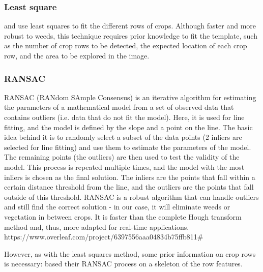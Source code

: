 \subsubsection{Least square}

\citet{LeastSquares2} and \citet{LeastSquares} use least squares to fit the different rows of crops. Although faster and more robust to weeds, this technique requires prior knowledge to fit the template, such as the number of crop rows to be detected, the expected location of each crop row, and the area to be explored in the image. \\


\subsubsection{RANSAC}

RANSAC (RANdom SAmple Consensus) is an iterative algorithm for estimating the parameters of a mathematical model from a set of observed data that contains outliers (i.e. data that do not fit the model). Here, it is used for line fitting, and the model is defined by the slope and a point on the line. The basic idea behind it is to randomly select a subset of the data points (2 inliers are selected for line fitting) and use them to estimate the parameters of the model. The remaining points (the outliers) are then used to test the validity of the model. This process is repeated multiple times, and the model with the most inliers is chosen as the final solution. The inliers are the points that fall within a certain distance threshold from the line, and the outliers are the points that fall outside of this threshold. RANSAC is a robust algorithm that can handle outliers and still find the correct solution - in our case, it will eliminate weeds or vegetation in between crops. It is faster than the complete Hough transform method and, thus, more adapted for real-time applications.
https://www.overleaf.com/project/6397556aaa04834b75ffb811#

However, as with the least squares method, some prior information on crop rows is necessary: \citet{RANSACbase} based their RANSAC process on a skeleton of the row features. \\ \\ \\ \\

